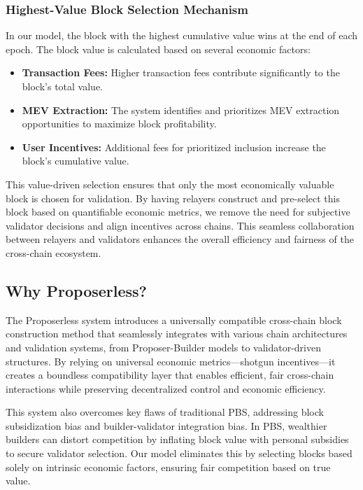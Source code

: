 \documentclass{article}
\begin{document}
\subsubsection{Highest-Value Block Selection Mechanism}

In our model, the block with the highest cumulative value wins at the end of each epoch. The block value is calculated based on several economic factors:

\begin{itemize}
    \item \textbf{Transaction Fees:} Higher transaction fees contribute significantly to the block's total value.
    \item \textbf{MEV Extraction:} The system identifies and prioritizes MEV extraction opportunities to maximize block profitability.
    \item \textbf{User Incentives:} Additional fees for prioritized inclusion increase the block's cumulative value.
\end{itemize}

This value-driven selection ensures that only the most economically valuable block is chosen for validation. By having relayers construct and pre-select this block based on quantifiable economic metrics, we remove the need for subjective validator decisions and align incentives across chains. This seamless collaboration between relayers and validators enhances the overall efficiency and fairness of the cross-chain ecosystem.

\subsection{Why Proposerless?}

The Proposerless system introduces a universally compatible cross-chain block construction method that seamlessly integrates with various chain architectures and validation systems, from Proposer-Builder models to validator-driven structures. By relying on universal economic metrics---shotgun incentives---it creates a boundless compatibility layer that enables efficient, fair cross-chain interactions while preserving decentralized control and economic efficiency.

This system also overcomes key flaws of traditional PBS, addressing block subsidization bias and builder-validator integration bias. In PBS, wealthier builders can distort competition by inflating block value with personal subsidies to secure validator selection. Our model eliminates this by selecting blocks based solely on intrinsic economic factors, ensuring fair competition based on true value.
\end{document}
